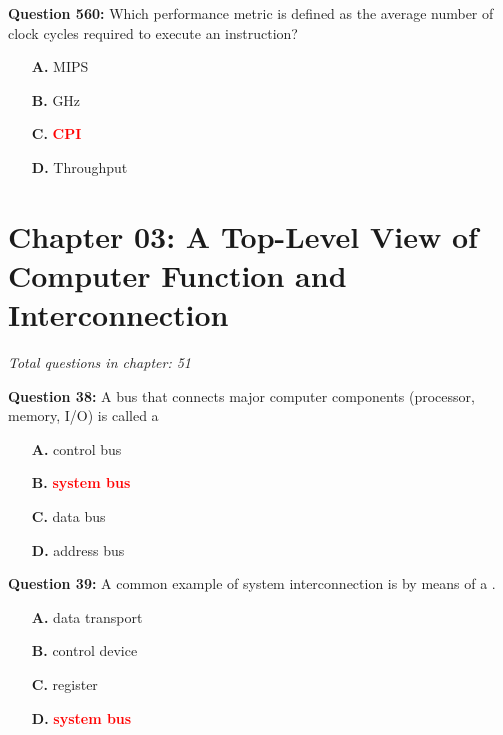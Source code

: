 \documentclass[12pt,a4paper]{article}
\begin{document}
\vspace{0.5cm}

\vspace{0.5cm}



\textbf{Question 560:} Which performance metric is defined as the average number of clock cycles required to execute an instruction?

\begin{itemize}
    \item[\textbf{A.}] MIPS
    \item[\textbf{B.}] GHz
    \item[\textbf{C.}] \textcolor{red}{\textbf{CPI}}
    \item[\textbf{D.}] Throughput
\end{itemize}

\section{Chapter 03: A Top-Level View of Computer Function and Interconnection}
\textit{Total questions in chapter: 51}

\textbf{Question 38:} A bus that connects major computer components (processor, memory, I/O) is called a \underline{\hspace{1.5cm}}

\begin{itemize}
    \item[\textbf{A.}] control bus
    \item[\textbf{B.}] \textcolor{red}{\textbf{system bus}}
    \item[\textbf{C.}] data bus
    \item[\textbf{D.}] address bus
\end{itemize}

\vspace{0.5cm}

\vspace{0.5cm}

\textbf{Question 39:} A common example of system interconnection is by means of a \underline{\hspace{1.5cm}}.

\begin{itemize}
    \item[\textbf{A.}] data transport
    \item[\textbf{B.}] control device
    \item[\textbf{C.}] register
    \item[\textbf{D.}] \textcolor{red}{\textbf{system bus}}
\end{itemize}
\end{document}
